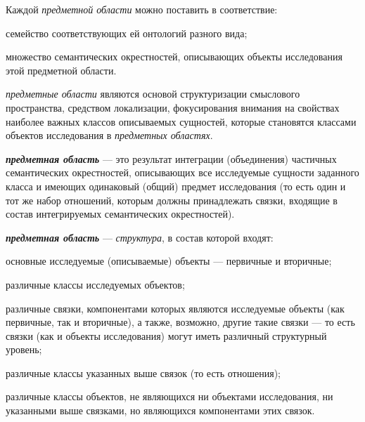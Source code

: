 Каждой \textit{предметной области} можно поставить в соответствие:
\begin{textitemize}
	\item {семейство соответствующих ей онтологий разного вида};
	\item {множество семантических окрестностей, описывающих объекты исследования этой предметной области}.
\end{textitemize}

\textit{предметные области} являются основой структуризации смыслового пространства, средством локализации, фокусирования внимания на свойствах наиболее важных классов описываемых сущностей, которые становятся классами объектов исследования в \textit{предметных областях}.

\begin{SCn}
\end{SCn}	

\bigskip
\textbf{\textit{предметная область}} --- это результат интеграции (объединения) частичных семантических окрестностей, описывающих все исследуемые сущности заданного класса и имеющих одинаковый (общий) предмет исследования (то есть один и тот же набор отношений, которым должны принадлежать связки, входящие в состав интегрируемых семантических окрестностей).

\textbf{\textit{предметная область}} --- \textit{структура}, в состав которой входят:
\begin{textitemize}
	\item основные исследуемые (описываемые) объекты --- первичные и вторичные;
	\item различные классы исследуемых объектов;
	\item различные связки, компонентами которых являются исследуемые объекты (как первичные, так и вторичные), а также, возможно, другие такие связки --- то есть связки (как и объекты исследования) могут иметь различный структурный уровень;
	\item различные классы указанных выше связок (то есть отношения);
	\item различные классы объектов, не являющихся ни объектами исследования, ни указанными выше связками, но являющихся компонентами этих связок.
\end{textitemize}

